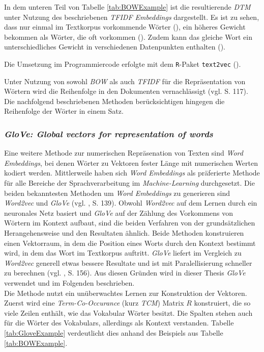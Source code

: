 \documentclass[a4paper,11pt]{article}
\begin{document}
In dem unteren Teil von Tabelle \ref{tab:BOWExample} ist die resultierende \textit{DTM} unter Nutzung des beschriebenen \textit{TFIDF Embeddings} dargestellt. Es ist zu sehen, dass nur einmal im Textkorpus vorkommende Wörter (), ein höheres Gewicht bekommen als Wörter, die oft vorkommen (). Zudem kann das gleiche Wort ein unterschiedliches Gewicht in verschiedenen Datenpunkten enthalten ().

Die Umsetzung im Programmiercode erfolgte mit dem \texttt{R}-Paket \texttt{text2vec} (\cite{text2vec}).

Unter Nutzung von sowohl \textit{BOW} als auch \textit{TFIDF} für die Repräsentation von Wörtern wird die Reihenfolge in den Dokumenten vernachlässigt (vgl. \cite{deepEssentials} S. 117). 
Die nachfolgend beschriebenen Methoden berücksichtigen hingegen die Reihenfolge der Wörter in einem Satz.


\subsubsection{\textit{GloVe: Global vectors for representation of words}} \label{Kap:Glove}

Eine weitere Methode zur numerischen Repräsenation von Texten sind \textit{Word Embeddings}, bei denen Wörter zu Vektoren fester Länge mit numerischen Werten kodiert werden. Mittlerweile haben sich \textit{Word Embeddings} als präferierte Methode für alle Bereiche der Sprachverarbeitung im \textit{Machine-Learning} durchgesetzt. Die beiden bekanntesten Methoden um \textit{Word Embeddings} zu generieren sind \textit{Word2vec} und \textit{GloVe} (vgl. \cite{keras}, S. 139). Obwohl \textit{Word2vec} auf dem Lernen durch ein neuronales Netz basiert und \textit{GloVe} auf der Zählung des Vorkommens von Wörtern im Kontext aufbaut, sind die beiden Verfahren von der grundsätzlichen Herangehensweise und den Resultaten ähnlich. Beide Methoden konstruieren einen Vektorraum, in dem die Position eines Worts durch den Kontext bestimmt wird, in dem das Wort im Textkorpus auftritt.
\textit{GloVe} liefert im Vergleich zu \textit{Word2vec} generell etwas bessere Resultate und ist mit Paralellisierung schneller zu berechnen (vgl. \cite{keras}, S. 156). Aus diesen Gründen wird in dieser Thesis \textit{GloVe} verwendet und im Folgenden beschrieben. \\
Die Methode nutzt ein unüberwachtes Lernen zur Konstruktion der Vektoren. Zuerst wird eine \textit{Term-Co-Occurance} (kurz \textit{TCM}) Matrix $R$ konstruiert, die so viele Zeilen enthält, wie das Vokabular Wörter besitzt. Die Spalten stehen auch für die Wörter des Vokabulars, allerdings als Kontext verstanden. Tabelle \ref{tab:GloveExample} verdeutlicht dies anhand des Beispiels aus Tabelle \ref{tab:BOWExample}.
\end{document}
